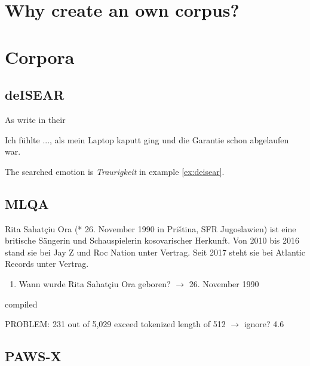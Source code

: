 
\label{chap:5_dataset}

\section{Why create an own corpus?}

\section{Corpora}

\subsection{deISEAR}

As \cite{troiano2019crowdsourcing} write in their 

\begin{examples}
	\label{ex:deisear}
	\item Ich fühlte ..., als mein Laptop kaputt ging und die Garantie schon abgelaufen war.
\end{examples}

The searched emotion is \textit{Traurigkeit} in example \ref{ex:deisear}.

\subsection{MLQA}

\begin{examples}
	\label{ex:mlqa}
	\item Rita Sahatçiu Ora (* 26. November 1990 in Priština, SFR Jugoslawien) ist eine britische Sängerin und Schauspielerin kosovarischer Herkunft. Von 2010 bis 2016 stand sie bei Jay Z und Roc Nation unter Vertrag. Seit 2017 steht sie bei Atlantic Records unter Vertrag.
\end{examples}

\begin{enumerate}
	\item Wann wurde Rita Sahatçiu Ora geboren? $\rightarrow$ 26. November 1990
\end{enumerate}

\cite{lewis2019mlqa} compiled

PROBLEM: 231 out of 5,029 exceed tokenized length of 512 $\rightarrow$ ignore? 4.6%

\subsection{PAWS-X}


